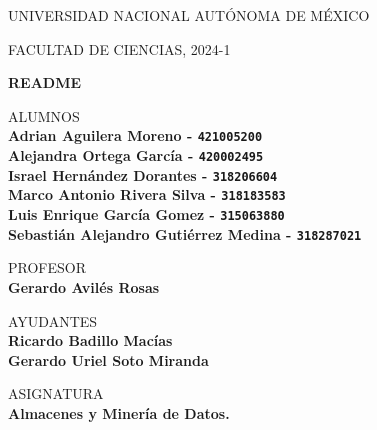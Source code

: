 \documentclass{article}
\begin{document}
	\begin{center}
	\vspace{0.8cm}
	\LARGE
	UNIVERSIDAD NACIONAL AUTÓNOMA DE MÉXICO 
	
	\vspace{0.7cm}
	\LARGE
	FACULTAD DE CIENCIAS, 2024-1
	
	\vspace{0.8 cm}	
	\Huge
	\textbf{README}

	\vspace{0.8 cm}
	\normalsize	
	ALUMNOS \\
	\vspace{.2cm}
	\large
	\textbf{Adrian Aguilera Moreno - \texttt{421005200}}\\
 	\textbf{Alejandra Ortega García - \texttt{420002495}}\\
	\textbf{Israel Hernández Dorantes - \texttt{318206604}}\\
        \textbf{Marco Antonio Rivera Silva - \texttt{318183583}}\\
        \textbf{Luis Enrique García Gomez - \texttt{315063880}}\\
	\textbf{Sebastián Alejandro Gutiérrez Medina - \texttt{318287021}}
	
	\vspace{1 cm}
	\normalsize	
	PROFESOR \\
	\vspace{.2cm}
	\large
	\textbf{Gerardo Avilés Rosas}
	
	\vspace{1 cm}
	AYUDANTES \\
	\vspace{.2cm}
	\large
 	\textbf{Ricardo Badillo Macías}\\
	\textbf{Gerardo Uriel Soto Miranda}\\
	\vspace{1.3cm}
	
	\normalsize	
	ASIGNATURA \\
	\vspace{.2cm}
	\Large
	\textbf{Almacenes y Minería de Datos.}
	
	\vspace{1 cm}
	\end{center}
\end{document}
